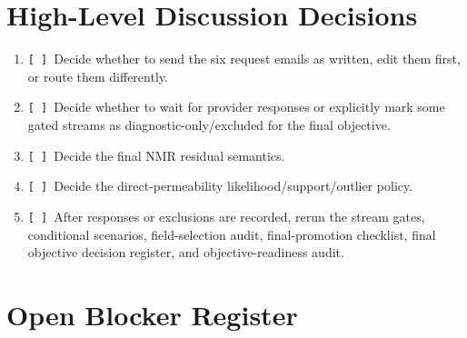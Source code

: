 \documentclass[10pt,a4paper]{article}
\newcommand{\checkbox}{\texttt{[ ]}}
\begin{document}
\section*{High-Level Discussion Decisions}

\begin{enumerate}
\item \checkbox\ Decide whether to send the six request emails as written, edit them first, or route them differently.
\item \checkbox\ Decide whether to wait for provider responses or explicitly mark some gated streams as diagnostic-only/excluded for the final objective.
\item \checkbox\ Decide the final NMR residual semantics.
\item \checkbox\ Decide the direct-permeability likelihood/support/outlier policy.
\item \checkbox\ After responses or exclusions are recorded, rerun the stream gates, conditional scenarios, field-selection audit, final-promotion checklist, final objective decision register, and objective-readiness audit.
\end{enumerate}

\section{Open Blocker Register}
\end{document}
